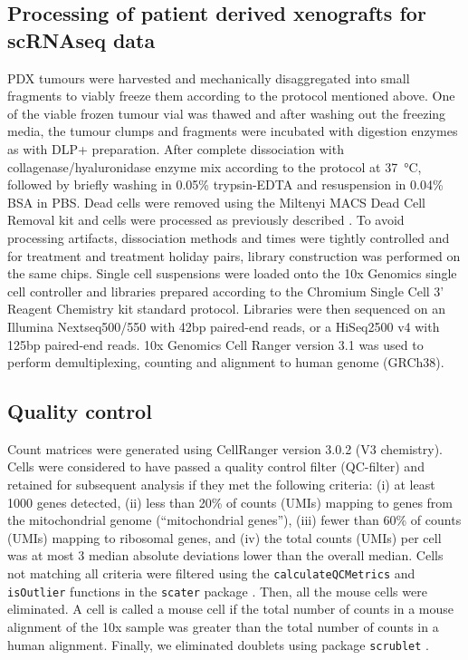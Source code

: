 \subsection{Processing of patient derived xenografts for scRNAseq data}
PDX tumours were harvested and mechanically disaggregated into small fragments to viably freeze them according to the protocol mentioned above. 
One of the viable frozen tumour vial was thawed and after washing out the freezing media, the tumour clumps and fragments were incubated with digestion enzymes as with DLP+ preparation. After complete dissociation with collagenase/hyaluronidase enzyme mix according to the protocol at \SI{37}{\degreeCelsius}, followed by briefly washing in 0.05\% trypsin-EDTA and resuspension in 0.04\% BSA in PBS. Dead cells were removed using the Miltenyi MACS Dead Cell Removal kit and cells were processed as previously described \cite{o2019dissociation}.
To avoid processing artifacts, dissociation methods and times were tightly controlled and for treatment and treatment holiday pairs, library construction was performed on the same chips. Single cell suspensions were loaded onto the 10x Genomics single cell controller and libraries prepared according to the Chromium Single Cell 3’ Reagent Chemistry kit standard protocol. 
Libraries were then sequenced on an Illumina Nextseq500/550 with 42bp paired-end reads, or a HiSeq2500 v4 with 125bp paired-end reads. 10x Genomics Cell Ranger version 3.1 was used to perform demultiplexing,  counting and alignment to human genome (GRCh38).

\subsection{Quality control}

Count matrices were generated using CellRanger version 3.0.2 (V3 chemistry). Cells were considered to have passed a quality control filter (QC-filter) and retained for subsequent analysis if they met the following criteria: (i) at least 1000 genes detected, (ii) less than 20\% of counts (UMIs) mapping to genes from the mitochondrial genome (``mitochondrial genes''), (iii) fewer than 60\% of counts (UMIs) mapping to ribosomal genes, and (iv) the total counts (UMIs) per cell was at most 3 median absolute deviations lower than the overall median. Cells not matching all criteria were filtered using the \texttt{calculateQCMetrics} and \texttt{isOutlier} functions in the \texttt{scater} package \cite{mccarthy2017scater}. Then, all the mouse cells were eliminated. A cell is called a mouse cell if the total number of counts in a mouse alignment of the 10x sample was greater than the total number of counts in a human alignment. Finally, we eliminated doublets using package \texttt{scrublet} \cite{scrublet}.

